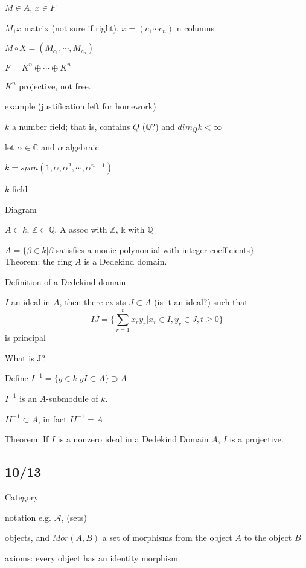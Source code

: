 \documentclass[12pt]{article}
\newcommand{\inv}{^{-1}}
\begin{document}
$M \in A$, $x \in F$

$M_1x$ matrix (not sure if right), $x = (c_1 \cdots c_n)$ n columns

$M \circ X = (M_{c_1}, \cdots, M_{c_n})$

$F = K^n \oplus \cdots \oplus K^n$

$K^n$ projective, not free.

\noindent
example (justification left for homework)

$k$ a number field; that is, contains $Q$ ($\mathds{Q}$?) and $dim_Qk < \infty$

let $\alpha \in \mathds{C}$ and $\alpha$ algebraic

$k = span(1, \alpha, \alpha^2, \cdots, \alpha^{n - 1})$

$k$ field

\noindent
Diagram

$A \subset k$, $\mathds{Z} \subset \mathds{Q}$, A assoc with $\mathds{Z}$, k with $\mathds{Q}$

\noindent
$A = \{\beta \in k| \beta$ satisfies a monic polynomial with integer coefficients$\}$\\

\noindent
Theorem: the ring $A$ is a Dedekind domain.

\noindent
Definition of a Dedekind domain

$I$ an ideal in $A$, then there exists $J \subset A$ (is it an ideal?) such that$$IJ = \{\sum_{r = 1}^t x_r y_r | x_r \in I, y_r \in J, t \geq 0\}$$ is principal

What is J?

Define $I\inv = \{y \in k | yI \subset A\} \supset A$

$I\inv$ is an $A$-submodule of $k$.

$II\inv \subset A$, in fact $II\inv = A$

\noindent
Theorem: If $I$ is a nonzero ideal in a Dedekind Domain $A$, $I$ is a projective.

\subsection{10/13}

\noindent
Category

notation e.g. $\mathcal{A}$, (sets)

objects, and $Mor(A, B)$ a set of morphisms from the object $A$ to the object $B$

axioms: every object has an identity morphism
\end{document}

